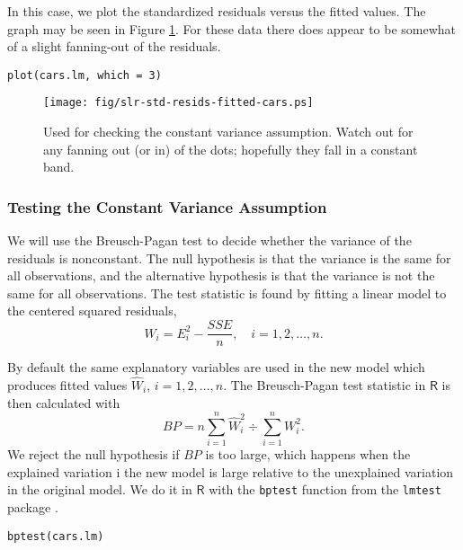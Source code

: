 In this case, we plot the standardized residuals versus the fitted
values. The graph may be seen in Figure \ref{fig-std-resids-fitted-cars}. For
these data there does appear to be somewhat of a slight fanning-out of
the residuals.

\begin{verbatim}
plot(cars.lm, which = 3)
\end{verbatim}

\begin{figure}[ht!]
\centering
\texttt{[image: fig/slr-std-resids-fitted-cars.ps]}
\caption[Plot of standardized residuals against the fitted values for the \texttt{cars} data]{\label{fig-std-resids-fitted-cars}\small Used for checking the constant variance assumption. Watch out for any fanning out (or in) of the dots; hopefully they fall in a constant band.}
\end{figure}

\subsubsection{Testing the Constant Variance Assumption}
\label{sec-11-4-2-1}

We will use the Breusch-Pagan test to decide whether the variance of
the residuals is nonconstant. The null hypothesis is that the variance
is the same for all observations, and the alternative hypothesis is
that the variance is not the same for all observations. The test
statistic is found by fitting a linear model to the centered squared
residuals,
\begin{equation}
W_{i} = E_{i}^{2} - \frac{SSE}{n}, \quad i=1,2,\ldots,n.
\end{equation}

By default the same explanatory variables are used in the new model
which produces fitted values \(\hat{W}_{i}\), \(i=1,2,\ldots,n\). The
Breusch-Pagan test statistic in \(\mathsf{R}\) is then calculated with
\begin{equation}
BP=n\sum_{i=1}^{n}\hat{W}_{i}^{2}\div\sum_{i=1}^{n}W_{i}^{2}.
\end{equation}
We reject the null hypothesis if \(BP\) is too large, which happens
when the explained variation i the new model is large relative to the
unexplained variation in the original model.  We do it in
\(\mathsf{R}\) with the \texttt{bptest} function from the \texttt{lmtest} package
\cite{lmtest}.
\begin{verbatim}
bptest(cars.lm)
\end{verbatim}

